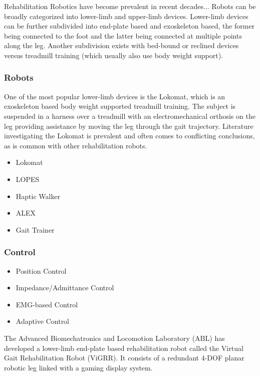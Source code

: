 \documentclass[12pt]{article}
\begin{document}
	Rehabilitation Robotics have become prevalent in recent decades... Robots can be broadly categorized into lower-limb and upper-limb devices. Lower-limb devices can be further subdivided into end-plate based and exoskeleton based, the former being connected to the foot and the latter being connected at multiple points along the leg. Another subdivision exists with bed-bound or reclined devices versus treadmill training (which usually also use body weight support). 
	
	\subsubsection{Robots}
	One of the most popular lower-limb devices is the Lokomat, which is an exoskeleton based body weight supported treadmill training. The subject is suspended in a harness over a treadmill with an electromechanical orthosis on the leg providing assistance by moving the leg through the gait trajectory. Literature investigating the Lokomat is prevalent and often comes to conflicting conclusions, as is common with other rehabilitation robots. 
	
	\begin{itemize}
		\item Lokomat
		\item LOPES
		\item Haptic Walker 
		\item ALEX
		\item Gait Trainer
	\end{itemize}

	
	\subsubsection{Control}
	
	\begin{itemize}
		\item Position Control
		\item Impedance/Admittance Control
		\item EMG-based Control
		\item Adaptive Control 
	\end{itemize}
	\cite{Meng2015}
	
	The Advanced Biomechatronics and Locomotion Laboratory (ABL) has developed a lower-limb end-plate based rehabilitation robot called the Virtual Gait Rehabilitation Robot (ViGRR). It consists of a redundant 4-DOF planar robotic leg linked with a gaming display system. \cite{Chisholm2010}
	
\end{document}
